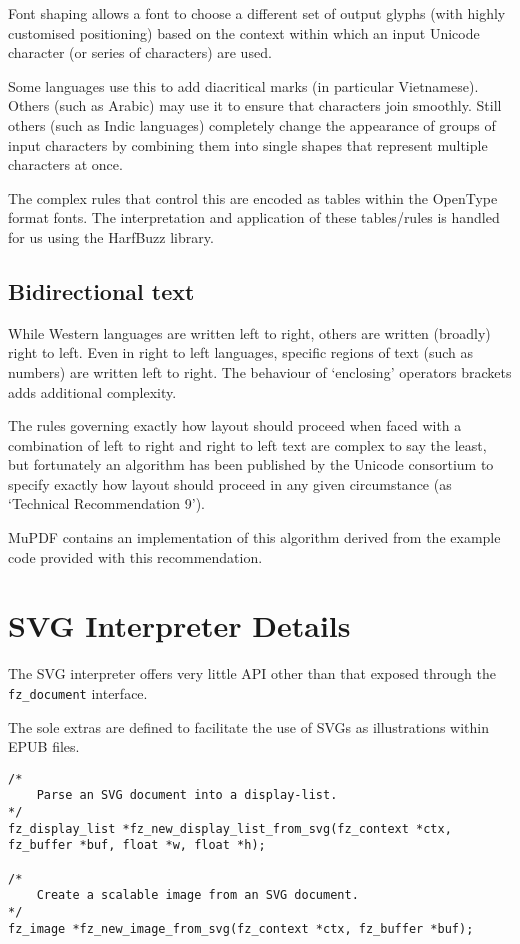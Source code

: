 \documentclass[oneside]{book}
\begin{document}
Font shaping allows a font to choose a different set of output glyphs (with highly customised positioning) based on the context within which an input Unicode character (or series of characters) are used.

Some languages use this to add diacritical marks (in particular Vietnamese). Others (such as Arabic) may use it to ensure that characters join smoothly. Still others (such as Indic languages) completely change the appearance of groups of input characters by combining them into single shapes that represent multiple characters at once.

The complex rules that control this are encoded as tables within the OpenType format fonts. The interpretation and application of these tables/rules is handled for us using the HarfBuzz library.

\section{Bidirectional text}

While Western languages are written left to right, others are written (broadly) right to left. Even in right to left languages, specific regions of text (such as numbers) are written left to right. The behaviour of `enclosing' operators brackets adds additional complexity.

The rules governing exactly how layout should proceed when faced with a combination of left to right and right to left text are complex to say the least, but fortunately an algorithm has been published by the Unicode consortium to specify exactly how layout should proceed in any given circumstance (as `Technical Recommendation 9').

MuPDF contains an implementation of this algorithm derived from the example code provided with this recommendation.

\chapter{SVG Interpreter Details}
\label{SVGInterpreter}

The SVG interpreter offers very little API other than that exposed through the \texttt{fz\_document} interface.

The sole extras are defined to facilitate the use of SVGs as illustrations within EPUB files.

\begin{lstlisting}
/*
	Parse an SVG document into a display-list.
*/
fz_display_list *fz_new_display_list_from_svg(fz_context *ctx, fz_buffer *buf, float *w, float *h);

/*
	Create a scalable image from an SVG document.
*/
fz_image *fz_new_image_from_svg(fz_context *ctx, fz_buffer *buf);
\end{lstlisting}
\end{document}
